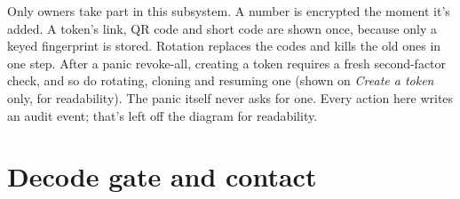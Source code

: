 Only owners take part in this subsystem. A number is encrypted the moment it's added. A token's link, QR code and short code are shown once, because only a keyed fingerprint is stored. Rotation replaces the codes and kills the old ones in one step. After a panic revoke-all, creating a token requires a fresh second-factor check, and so do rotating, cloning and resuming one (shown on \emph{Create a token} only, for readability). The panic itself never asks for one. Every action here writes an audit event; that's left off the diagram for readability.

\section{Decode gate and contact}
\label{sec:uc-gate}

